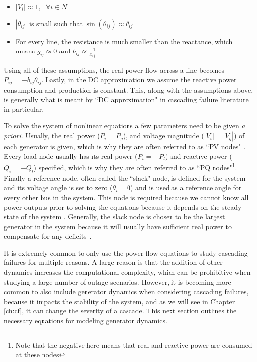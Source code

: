 \begin{itemize}
	\item  $|V_i| \approx 1,\ \ \ \forall i \in N$
	\item $|\theta_{ij}|$ is small such that $\sin(\theta_{ij})\approx \theta_{ij}$
	\item For every line, the resistance is much smaller than the reactance, which means $g_{ij} \approx 0$ and $b_{ij} \approx \frac{-1}{x_{ij}}$
\end{itemize}
Using all of these assumptions, the real power flow across a line becomes $P_{ij} = -b_{ij} \theta_{ij}$.  Lastly, in the DC approximation we assume the reactive power consumption and production is constant.  This, along with the assumptions above, is generally what is meant by ``DC approximation" in cascading failure literature in  particular.

To solve the system of nonlinear equations a few parameters need to be given \textit{a priori}.  Usually, the real power ($P_i=P_{g}$), and voltage magnitude ($|V_i| = |V_{g}|$) of each generator is given, which is why they are often referred to as ``PV nodes" \cite{ferc_acopf}.  Every load node usually has its real power ($P_i = -P_{l}$) and reactive power ($Q_i = -Q_{l}$) specified, which is why they are often referred to as ``PQ nodes"\footnote{Note that the negative here means that real and reactive power are consumed at these nodes}.  Finally a reference node, often called the ``slack" node, is defined for the system and its voltage angle is set to zero ($\theta_i = 0$) and is used as a reference angle for every other bus in the system.  This node is required because we cannot know all power outputs prior to solving the equations because it depends on the steady-state of the system \cite{Takashi2015}.  Generally, the slack node is chosen to be the largest generator in the system because it will usually have sufficient real power to compensate for any deficits~\cite{ferc_acopf}.

It is extremely common to only use the power flow equations to study cascading failures for multiple reasons.  A large reason is that the addition of other dynamics increases the computational complexity, which can be prohibitive when studying a large number of outage scenarios.  However, it is becoming more common to also include generator dynamics when considering cascading failures, because it impacts the stability of the system, and as we will see in Chapter \ref{ch:cf}, it can change the severity of a cascade.  This next section outlines the necessary equations for modeling generator dynamics.
